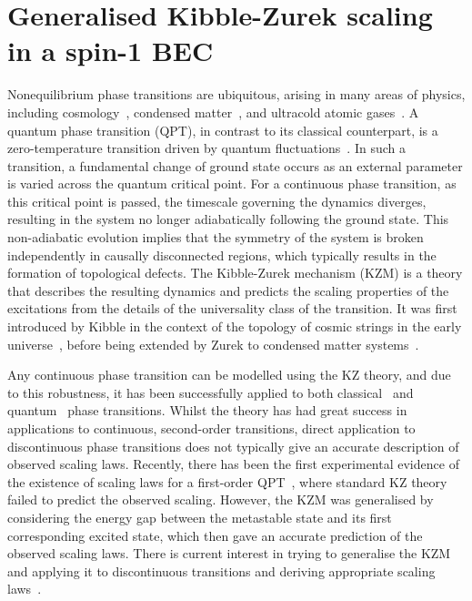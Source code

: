 \chapter{Generalised Kibble-Zurek scaling in a spin-1 BEC}\label{chap: spin-1}

Nonequilibrium phase transitions are ubiquitous, arising in many areas of
physics, including cosmology~\cite{Kibble1980,Mazumdar2019}, condensed
matter~\cite{Chuang1991,Hendry1994,Bauerle1996,Ruutu1996,Sondhi1997,
Polkovnikov2011}, and ultracold atomic gases~\cite{Hadzibabic2006,Langen2015,
Fletcher2015,Liu2018}.
A quantum phase transition (QPT), in contrast to its classical counterpart, is a
zero-temperature transition driven by quantum fluctuations~\cite{Sachdev2011}.
In such a transition, a fundamental change of ground state occurs as an external
parameter is varied across the quantum critical point.
For a continuous phase transition, as this critical point is passed, the
timescale governing the dynamics diverges, resulting in the system no longer
adiabatically following the ground state.
This non-adiabatic evolution implies that the symmetry of the system is broken
independently in causally disconnected regions, which typically results in the
formation of topological defects.
The Kibble-Zurek mechanism (KZM) is a theory that describes the resulting
dynamics and predicts the scaling properties of the excitations from the details
of the universality class of the transition.
It was first introduced by Kibble in the context of the topology of cosmic
strings in the early universe~\cite{Kibble1976, Kibble1980}, before being
extended by Zurek to condensed matter systems~\cite{Zurek1985, Zurek1993,
    Zurek1996}.

Any continuous phase transition can be modelled using the KZ theory, and due to
this robustness, it has been successfully applied to both
classical~\cite{Donadello2016,Beugnon2017} and
quantum~\cite{Dziarmaga2005, Damski2005, Lamacraft2007} phase transitions.
Whilst the theory has had great success in applications to continuous,
second-order transitions, direct application to discontinuous phase transitions
does not typically give an accurate description of observed scaling laws.
Recently, there has been the first experimental evidence of the existence of
scaling laws for a first-order QPT~\cite{Qiu2020}, where standard KZ theory
failed to predict the observed scaling.
However, the KZM was generalised by considering the energy gap between the
metastable state and its first corresponding excited state, which then gave an
accurate prediction of the observed scaling laws.
There is current interest in trying to generalise the KZM and applying it to
discontinuous transitions and deriving appropriate scaling
laws~\cite{Divakaran2008, Suzuki2015}.

